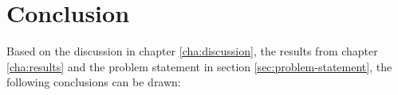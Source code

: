 \chapter{Conclusion}\label{cha:conclusion}
Based on the discussion in chapter \ref{cha:discussion}, the results from chapter \ref{cha:results} and the problem statement in section \ref{sec:problem-statement}, the following conclusions can be drawn: